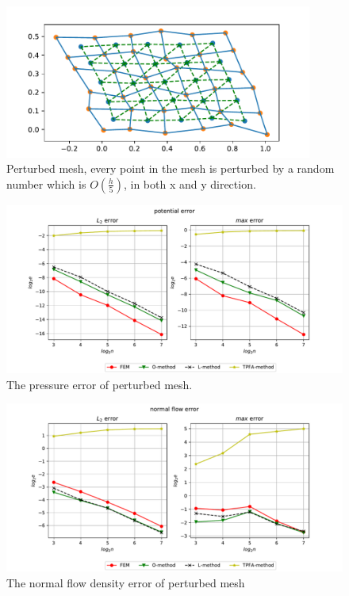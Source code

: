 \documentclass[../Main/main.tex]{subfiles}
\begin{document}
		\begin{figure}[H]
			\centering
			\includegraphics[width=0.9\textwidth]{mesh_perturbed.pdf}
			\caption{Perturbed mesh, every point in the mesh is perturbed by a random number which is $O(\frac{h}{5})$, in both x and y direction.}
			\label{fig:mesh_perturbed}
		\end{figure}
		\begin{figure}[h]
		\advance\leftskip-1cm
			\includegraphics[width=1.2\textwidth]{pressure_perturbed_1d1.pdf}
			\caption{The pressure error of perturbed mesh.}
			\label{fig:mesh_perturbed_potential}
		\end{figure}
		\begin{figure}[h]
		\advance\leftskip-1cm
			\includegraphics[width=1.2\textwidth]{flow_perturbed_1d1.pdf}
			\caption{The normal flow density error of perturbed mesh}
			\label{fig:mesh_perturbed_flow}
		\end{figure}
\end{document}
